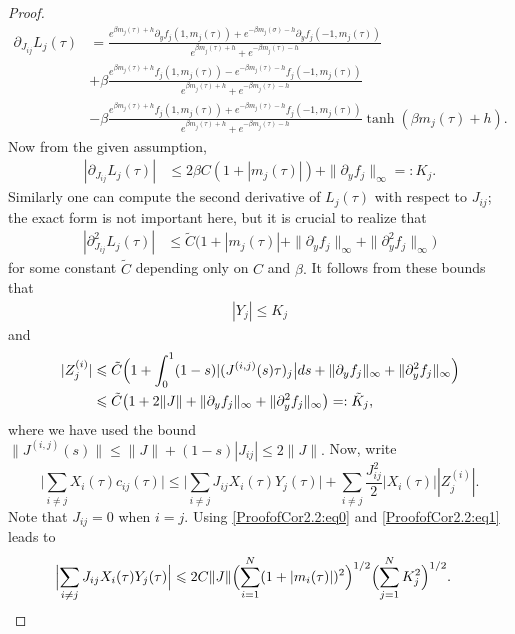 \documentclass[letterpaper,11pt,reqno]{amsart}
\renewcommand{\le}{\leqslant}
\renewcommand{\leq}{\leqslant}
\newcommand{\mvgs}{{\sigma}}
\newcommand{\mvgt}{{\tau}}
\begin{document}
\begin{proof}
\begin{align*}
    \partial_{J_{ij}}L_j(\mvgt)&=\frac{e^{\beta m_j(\mvgt)+h}\partial_yf_j(1,m_j(\mvgt))+e^{-\beta m_j(\mvgs)-h}\partial_yf_j(-1,m_j(\mvgt))}{e^{\beta m_j(\mvgt)+h}+e^{-\beta m_j(\mvgt)-h}}\\
    &+\beta\frac{e^{\beta m_j(\mvgt)+h}f_j(1,m_j(\mvgt))-e^{-\beta m_j(\mvgt)-h}f_j(-1,m_j(\mvgt))}{e^{\beta m_j(\mvgt)+h}+e^{-\beta m_j(\mvgt)-h}}\\
    &-\beta\frac{e^{\beta m_j(\mvgt)+h}f_j(1,m_j(\mvgt))+e^{-\beta m_j(\mvgt)-h}f_j(-1,m_j(\mvgt))}{e^{\beta m_j(\mvgt)+h}+e^{-\beta m_j(\mvgt)-h}}\tanh(\beta m_j(\mvgt)+h).
\end{align*}
Now from the given assumption,
\begin{align*}
  |\partial_{J_{ij}}L_j(\mvgt)|&\leq 2\beta C(1+|m_j(\tau)|)+\|\partial_yf_j\|_\infty=:K_j.
\end{align*}
Similarly one can compute the second derivative of $L_j(\mvgt)$ with respect to $J_{ij}$; the exact form is not important here, but it is crucial to realize that
\begin{align*}
    |\partial_{J_{ij}}^2L_j(\mvgt)|&\leq \tilde C\bigl(1+|m_j(\tau)|+\|\partial_yf_j\|_\infty+\|\partial_y^2f_j\|_\infty\bigr)
\end{align*}
for some constant $\tilde C$ depending only on $C$ and $\beta.$ It follows from these bounds that 
\begin{align}\label{ProofofCor2.2:eq1}
    |Y_j|\leq K_j
\end{align} and
\begin{align}
 \nonumber   |Z_j^{(i)}|&\leq \tilde{C}\Bigl(1+\int_0^1(1-s)|(J^{(i,j)}(s)\tau)_j\bigr|ds+\|\partial_yf_j\|_\infty+\|\partial_y^2f_j\|_\infty\Bigr)\\
\label{ProofofCor2.2:eq2}    &\leq \tilde{C}\bigl(1+2\|J\|+\|\partial_yf_j\|_\infty+\|\partial_y^2f_j\|_\infty\bigr)=:\tilde{K}_j,
\end{align}
where we have used the bound $\|J^{(i,j)}(s)\|\leq \|J\|+(1-s)|J_{ij}|\leq 2\|J\|.$
Now, write
\[ \Big| \sum_{i \ne j} X_i(\tau) c_{ij}(\tau) \Big |\le \Big| \sum_{i \ne j} J_{ij} X_i(\tau) Y_j(\tau) \Big| + \sum_{i \ne j} \frac{J_{ij}^2}{2}|X_i(\tau)| |Z_j^{(i)}| .
\]
Note that $J_{ij}=0$ when $i=j$. Using \eqref{ProofofCor2.2:eq0} and \eqref{ProofofCor2.2:eq1} leads to
\begin{align*}
\Bigl|  \sum_{i\neq j} J_{ij} X_i(\gt) Y_j(\tau)  \Bigr|&\leq 2C\|J\|\Bigl(\sum_{i=1}^N(1+|m_i(\tau)|)^2\Bigr)^{1/2}\Bigl(\sum_{j=1}^NK_j^2\Bigr)^{1/2}.
\end{align*}

\end{proof}
\end{document}
